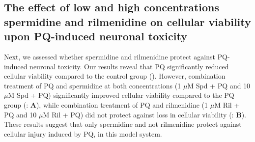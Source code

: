 \subsection{The effect of low and high concentrations spermidine and rilmenidine on cellular viability upon PQ-induced neuronal toxicity} 
Next, we assessed whether spermidine and rilmenidine protect against PQ-induced neuronal toxicity. Our results reveal that PQ significantly reduced cellular viability compared to the control group (). However, combination treatment of PQ and spermidine at both concentrations (1 $\mu$M Spd + PQ and 10 $\mu$M Spd + PQ) significantly improved cellular viability compared to the PQ group (: \textbf{A}), while combination treatment of PQ and rilmenidine (1 $\mu$M Ril + PQ and 10 $\mu$M Ril + PQ) did not protect against loss in cellular viability (: \textbf{B}). These results suggest that only spermidine and not rilmenidine protect against cellular injury induced by PQ, in this model system.

